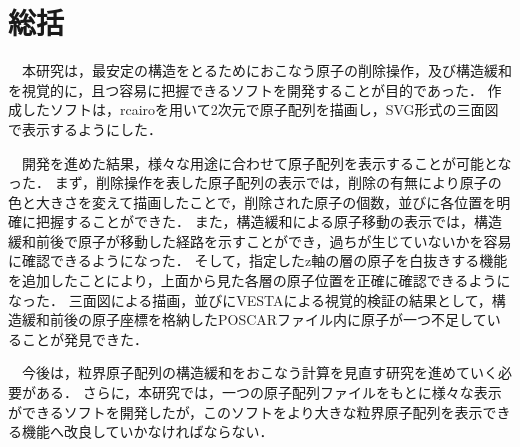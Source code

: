 \section{総括}
　本研究は，最安定の構造をとるためにおこなう原子の削除操作，及び構造緩和を視覚的に，且つ容易に把握できるソフトを開発することが目的であった．
作成したソフトは，rcairoを用いて2次元で原子配列を描画し，SVG形式の三面図で表示するようにした．

　開発を進めた結果，様々な用途に合わせて原子配列を表示することが可能となった．
まず，削除操作を表した原子配列の表示では，削除の有無により原子の色と大きさを変えて描画したことで，削除された原子の個数，並びに各位置を明確に把握することができた．
また，構造緩和による原子移動の表示では，構造緩和前後で原子が移動した経路を示すことができ，過ちが生じていないかを容易に確認できるようになった．
そして，指定したz軸の層の原子を白抜きする機能を追加したことにより，上面から見た各層の原子位置を正確に確認できるようになった．
三面図による描画，並びにVESTAによる視覚的検証の結果として，構造緩和前後の原子座標を格納したPOSCARファイル内に原子が一つ不足していることが発見できた．

　今後は，粒界原子配列の構造緩和をおこなう計算を見直す研究を進めていく必要がある．
さらに，本研究では，一つの原子配列ファイルをもとに様々な表示ができるソフトを開発したが，このソフトをより大きな粒界原子配列を表示できる機能へ改良していかなければならない．


